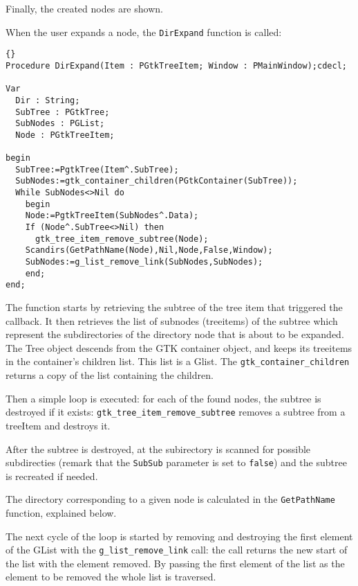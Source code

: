 \documentclass[10pt]{article}
\begin{document}
Finally, the created nodes are shown.

When the user expands a node, the \lstinline|DirExpand| function is
called:
\begin{lstlisting}{}
Procedure DirExpand(Item : PGtkTreeItem; Window : PMainWindow);cdecl;
 
Var 
  Dir : String;
  SubTree : PGtkTree;
  SubNodes : PGList;
  Node : PGtkTreeItem;
   
begin
  SubTree:=PgtkTree(Item^.SubTree);
  SubNodes:=gtk_container_children(PGtkContainer(SubTree));
  While SubNodes<>Nil do
    begin
    Node:=PgtkTreeItem(SubNodes^.Data);
    If (Node^.SubTree<>Nil) then 
      gtk_tree_item_remove_subtree(Node);
    Scandirs(GetPathName(Node),Nil,Node,False,Window);
    SubNodes:=g_list_remove_link(SubNodes,SubNodes);
    end;
end;
\end{lstlisting}
The function starts by retrieving the subtree of the tree item that
triggered the callback. It then retrieves the list of subnodes (treeitems)
of the subtree which represent the subdirectories of the directory node 
that is about to be expanded. The Tree object descends from the GTK
container object, and keeps its treeitems in the container's children
list. This list is a Glist. The \lstinline|gtk_container_children| returns
a copy of the list containing the children.

Then a simple loop is executed: for each of
the found nodes, the subtree is destroyed if it exists:
\lstinline|gtk_tree_item_remove_subtree| removes a subtree from a treeItem
and destroys it. 

After the subtree is destroyed, at the subirectory is scanned for possible
subdirecties (remark that the \lstinline|SubSub| parameter is set to 
\lstinline|false|) and the subtree is recreated if needed.

The directory corresponding to a given node is calculated in the 
\lstinline|GetPathName| function, explained below.

The next cycle of the loop is started by removing and destroying the first
element of the GList with the \lstinline|g_list_remove_link| call:
the call returns the new start of the list with the element removed. By
passing the first element of the list as the element to be removed the 
whole list is traversed.
\end{document}
